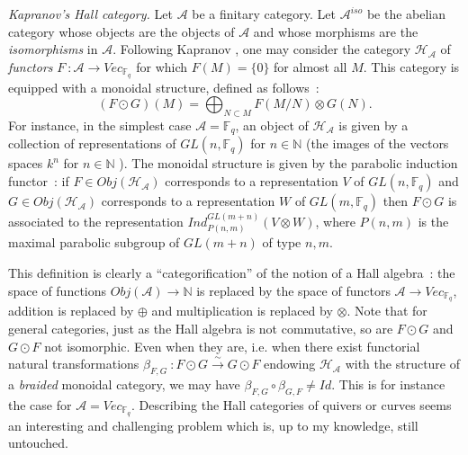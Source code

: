 \documentclass[a4paper,10pt]{amsart}
\def\N{\mathbb{N}}
\def\A{\mathcal{A}}
\numberwithin{equation}{section}
\begin{document}
{\noindent
\textit{Kapranov's Hall category.} Let $\mathcal{A}$ be a finitary category. Let $\mathcal{A}^{iso}$ be the abelian category whose objects are the objects of $\mathcal{A}$ and whose morphisms are the \textit{isomorphisms} in $\mathcal{A}$. Following Kapranov \cite{Kaporal}, one may consider the category $\mathcal{H}_\mathcal{A}$ of \textit{functors} $F~:\mathcal{A} \to Vec_{\mathbb{F}_q}$ for which $F(M)=\{0\}$ for almost all $M$. This category is equipped with a monoidal structure, defined as follows~:
$$(F \odot G) (M)=\bigoplus_{N \subset M} F(M/N) \otimes G(N).$$
For instance, in the simplest case $\mathcal{A}=\mathbb{F}_q$, an object of $\mathcal{H}_\mathcal{A}$ is given by a collection of representations of $GL(n,\mathbb{F}_q)$ for $n \in \N$ (the images of the vectors spaces $k^n$ for $n \in \N$ ). The monoidal structure is given by the parabolic induction functor~: if $F \in Obj(\mathcal{H}_{\mathcal{A}})$ corresponds to a representation $V$ of $GL(n,\mathbb{F}_q)$ and $G \in Obj(\mathcal{H}_{\A})$ corresponds to a representation $W$ of $GL(m,\mathbb{F}_q)$ then $F \odot G$ is associated to the representation
$Ind_{P(n,m)}^{GL(m+n)}(V \otimes W)$, where $P(n,m)$ is the maximal parabolic subgroup of $GL(m+n)$ of type $n,m$.

This definition is clearly a ``categorification'' of the notion of a Hall algebra~: the space of functions
$Obj(\mathcal{A}) \to \N$ is replaced by the space of functors $\A \to Vec_{\mathbb{F}_q}$, addition is replaced by $\oplus$ and multiplication is replaced by $\otimes$.
Note that for general categories, just as the Hall algebra is not commutative, so are $F \odot G$ and $G \odot F$ not isomorphic. Even when they are, i.e. when there exist  functorial natural transformations $\beta_{F,G}~: F \odot G \stackrel{\sim}{\to} G \odot F$ endowing $\mathcal{H}_\A$ with the structure of a \textit{braided} monoidal category, we may have $\beta_{F,G} \circ \beta_{G,F} \neq Id$. This is for instance the case for $\A=Vec_{\mathbb{F}_q}$. Describing the Hall categories of quivers or curves seems an interesting and challenging problem which is, up to my knowledge, still untouched.

\vspace{.2in}

}
\end{document}
